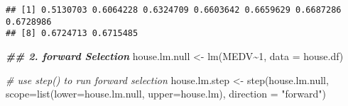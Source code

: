 \documentclass[
]{article}
\newenvironment{Shaded}{\begin{snugshade}}{\end{snugshade}}
\newcommand{\AttributeTok}[1]{\textcolor[rgb]{0.77,0.63,0.00}{#1}}
\newcommand{\CommentTok}[1]{\textcolor[rgb]{0.56,0.35,0.01}{\textit{#1}}}
\newcommand{\DecValTok}[1]{\textcolor[rgb]{0.00,0.00,0.81}{#1}}
\newcommand{\DocumentationTok}[1]{\textcolor[rgb]{0.56,0.35,0.01}{\textbf{\textit{#1}}}}
\newcommand{\FunctionTok}[1]{\textcolor[rgb]{0.00,0.00,0.00}{#1}}
\newcommand{\NormalTok}[1]{#1}
\newcommand{\OtherTok}[1]{\textcolor[rgb]{0.56,0.35,0.01}{#1}}
\newcommand{\SpecialCharTok}[1]{\textcolor[rgb]{0.00,0.00,0.00}{#1}}
\newcommand{\StringTok}[1]{\textcolor[rgb]{0.31,0.60,0.02}{#1}}
\begin{document}
\begin{verbatim}
## [1] 0.5130703 0.6064228 0.6324709 0.6603642 0.6659629 0.6687286 0.6728986
## [8] 0.6724713 0.6715485
\end{verbatim}

\begin{Shaded}
\begin{Highlighting}[]
\DocumentationTok{\#\# 2. forward Selection}
\NormalTok{house.lm.null }\OtherTok{\textless{}{-}} \FunctionTok{lm}\NormalTok{(MEDV}\SpecialCharTok{\textasciitilde{}}\DecValTok{1}\NormalTok{, }\AttributeTok{data =}\NormalTok{ house.df)}

\CommentTok{\# use step() to run forward selection}
\NormalTok{house.lm.step }\OtherTok{\textless{}{-}} \FunctionTok{step}\NormalTok{(house.lm.null,   }
                    \AttributeTok{scope=}\FunctionTok{list}\NormalTok{(}\AttributeTok{lower=}\NormalTok{house.lm.null, }\AttributeTok{upper=}\NormalTok{house.lm), }\AttributeTok{direction =}  
                      \StringTok{"forward"}\NormalTok{)}
\end{Highlighting}
\end{Shaded}
\end{document}
